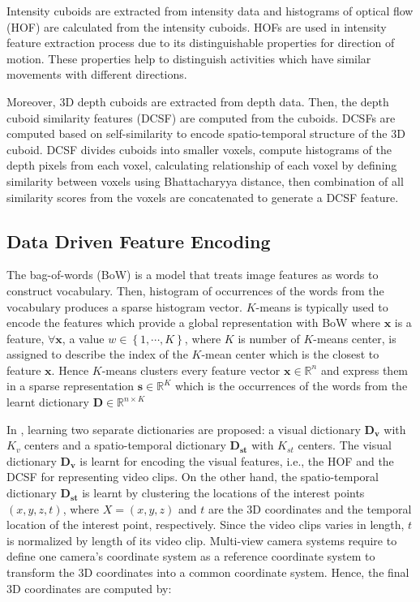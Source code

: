Intensity cuboids are extracted from intensity data and histograms of optical flow (HOF) are calculated from the intensity cuboids. HOFs are used in intensity feature extraction process due to its distinguishable properties for direction of motion. These properties help to distinguish activities which have similar movements with different directions.

Moreover, 3D depth cuboids are extracted from depth data. Then, the depth cuboid similarity features (DCSF) \cite{6619209} are computed from the cuboids. DCSFs are computed based on self-similarity to encode spatio-temporal structure of the 3D cuboid. DCSF divides cuboids into smaller voxels, compute histograms of the depth pixels from each voxel, calculating relationship of each voxel by defining similarity between voxels using Bhattacharyya distance, then combination of all similarity scores from the voxels are concatenated to generate a DCSF feature.

\subsection{Data Driven Feature Encoding}
\label{section:DataDrivenFeatureEncoding}

	The bag-of-words (BoW) is a model that treats image features as words to construct vocabulary. Then, histogram of occurrences of the words from the vocabulary produces a sparse histogram vector. $K$-means is typically used to encode the features which provide a global representation with BoW where $\mathbf{x}$ is a feature, $ \forall \mathbf{x} $, a value $w\in\left\{ 1,\cdots,K\right\}$, where $K$ is number of $K$-means center, is assigned to describe the index of the $K$-mean center which is the closest to feature $\mathbf{x}$. Hence $K$-means clusters every feature vector $\mathbf{x}\in\mathbb{R}^{n}$ and express them in a sparse representation $\mathbf{s}\in\mathbb{R}^{K}$ which is the occurrences of the words from the learnt dictionary $\mathbf{D}\in\mathbb{R}^{n\times K}$

	In \cite{twinanda2015data}, learning two separate dictionaries are proposed: a visual dictionary $\mathbf{D_{v}}$ with $K_{v}$ centers and a spatio-temporal dictionary $\mathbf{D_{st}}$ with $K_{st}$ centers. The visual dictionary $\mathbf{D_{v}}$ is learnt for encoding the visual features, i.e., the HOF and the DCSF for representing video clips. On the other hand, the spatio-temporal dictionary $\mathbf{D_{st}}$ is learnt by clustering the locations of the interest points $\left(x,y,z,t\right)$, where $X=\left(x,y,z\right)$
and $t$ are the 3D coordinates and the temporal location
of the interest point, respectively. Since the video clips varies in length, $t$ is normalized by length of its video clip. Multi-view camera systems require to define one camera's coordinate system as a reference coordinate system to transform the 3D coordinates into a common coordinate system. Hence, the final 3D coordinates are computed by:

